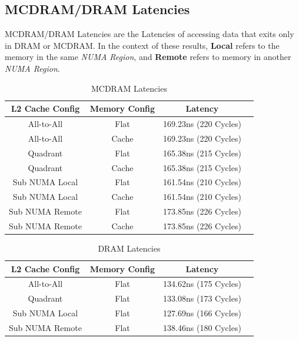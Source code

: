 \documentclass[bsc,frontabs,twoside,singlespacing,parskip,deptreport]{infthesis}     %
\begin{document}
\newpage
\subsection{MCDRAM/DRAM Latencies}
MCDRAM/DRAM Latencies are the Latencies of accessing data that exits only in DRAM or MCDRAM. In the context of these results, \textbf{Local} refers to the memory in the same \emph{NUMA Region}, and \textbf{Remote} refers to memory in another \emph{NUMA Region}.
\begin{table}[!h]
\begin{center}
\caption{MCDRAM Latencies}
\label{fig:mcdram-latencies}
\begin{tabular}{ |c|c|c|c| } 
    \hline
    L2 Cache Config & Memory Config & Latency \\
    \hline
    All-to-All      & Flat  & 169.23ns (220 Cycles) \\
    All-to-All      & Cache & 169.23ns (220 Cycles) \\
    Quadrant        & Flat  & 165.38ns (215 Cycles) \\
    Quadrant        & Cache & 165.38ns (215 Cycles) \\
    Sub NUMA Local  & Flat  & 161.54ns (210 Cycles) \\
    Sub NUMA Local  & Cache & 161.54ns (210 Cycles) \\ %
    Sub NUMA Remote & Flat  & 173.85ns (226 Cycles) \\
    Sub NUMA Remote & Cache & 173.85ns (226 Cycles) \\
    \hline
\end{tabular}
\end{center}
\end{table}

\begin{table}[!h]
\begin{center}
\caption{DRAM Latencies}
\label{fig:dram-latencies}
\begin{tabular}{ |c|c|c|c| } 
    \hline
    L2 Cache Config & Memory Config & Latency \\
    \hline
    All-to-All      & Flat  & 134.62ns (175 Cycles) \\
    Quadrant        & Flat  & 133.08ns (173 Cycles) \\
    Sub NUMA Local  & Flat  & 127.69ns (166 Cycles) \\
    Sub NUMA Remote & Flat  & 138.46ns (180 Cycles) \\
    \hline
\end{tabular}
\end{center}
\end{table}
\end{document}

